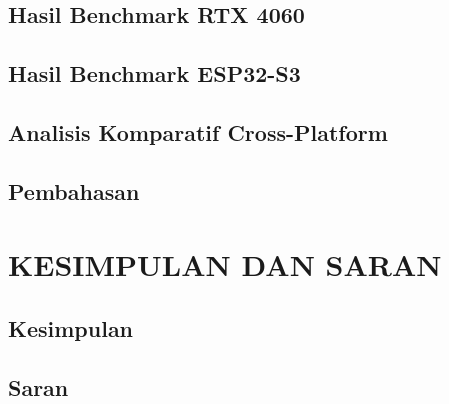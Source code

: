 \documentclass[12pt, a4paper]{report}
\begin{document}
\section{Hasil Benchmark RTX 4060}

\section{Hasil Benchmark ESP32-S3}

\section{Analisis Komparatif Cross-Platform}

\section{Pembahasan}

\chapter{KESIMPULAN DAN SARAN}

\section{Kesimpulan}

\section{Saran}



\end{document}

